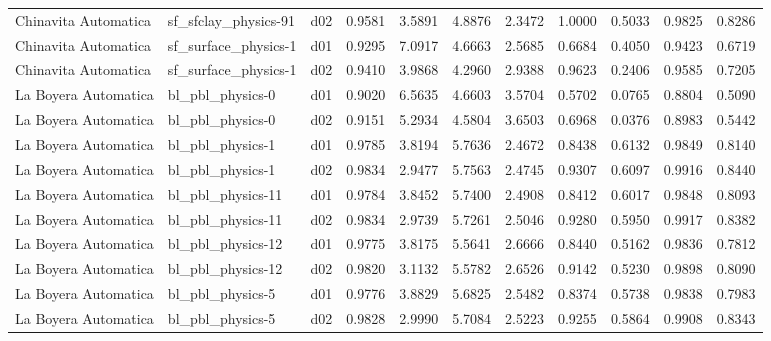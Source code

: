 \begin{longtable}{lllrrrrrrrr}
 Chinavita Automatica  &  sf\_sfclay\_physics-91 &     d02 &   0.9581 &   3.5891 &   4.8876 &       2.3472 &        1.0000 &       0.5033 &           0.9825 &  0.8286 \\
 Chinavita Automatica  &  sf\_surface\_physics-1 &     d01 &   0.9295 &   7.0917 &   4.6663 &       2.5685 &        0.6684 &       0.4050 &           0.9423 &  0.6719 \\
 Chinavita Automatica  &  sf\_surface\_physics-1 &     d02 &   0.9410 &   3.9868 &   4.2960 &       2.9388 &        0.9623 &       0.2406 &           0.9585 &  0.7205 \\
 La Boyera Automatica  &      bl\_pbl\_physics-0 &     d01 &   0.9020 &   6.5635 &   4.6603 &       3.5704 &        0.5702 &       0.0765 &           0.8804 &  0.5090 \\
 La Boyera Automatica  &      bl\_pbl\_physics-0 &     d02 &   0.9151 &   5.2934 &   4.5804 &       3.6503 &        0.6968 &       0.0376 &           0.8983 &  0.5442 \\
 La Boyera Automatica  &      bl\_pbl\_physics-1 &     d01 &   0.9785 &   3.8194 &   5.7636 &       2.4672 &        0.8438 &       0.6132 &           0.9849 &  0.8140 \\
 La Boyera Automatica  &      bl\_pbl\_physics-1 &     d02 &   0.9834 &   2.9477 &   5.7563 &       2.4745 &        0.9307 &       0.6097 &           0.9916 &  0.8440 \\
 La Boyera Automatica  &     bl\_pbl\_physics-11 &     d01 &   0.9784 &   3.8452 &   5.7400 &       2.4908 &        0.8412 &       0.6017 &           0.9848 &  0.8093 \\
 La Boyera Automatica  &     bl\_pbl\_physics-11 &     d02 &   0.9834 &   2.9739 &   5.7261 &       2.5046 &        0.9280 &       0.5950 &           0.9917 &  0.8382 \\
 La Boyera Automatica  &     bl\_pbl\_physics-12 &     d01 &   0.9775 &   3.8175 &   5.5641 &       2.6666 &        0.8440 &       0.5162 &           0.9836 &  0.7812 \\
 La Boyera Automatica  &     bl\_pbl\_physics-12 &     d02 &   0.9820 &   3.1132 &   5.5782 &       2.6526 &        0.9142 &       0.5230 &           0.9898 &  0.8090 \\
 La Boyera Automatica  &      bl\_pbl\_physics-5 &     d01 &   0.9776 &   3.8829 &   5.6825 &       2.5482 &        0.8374 &       0.5738 &           0.9838 &  0.7983 \\
 La Boyera Automatica  &      bl\_pbl\_physics-5 &     d02 &   0.9828 &   2.9990 &   5.7084 &       2.5223 &        0.9255 &       0.5864 &           0.9908 &  0.8343 \\

\end{longtable}
